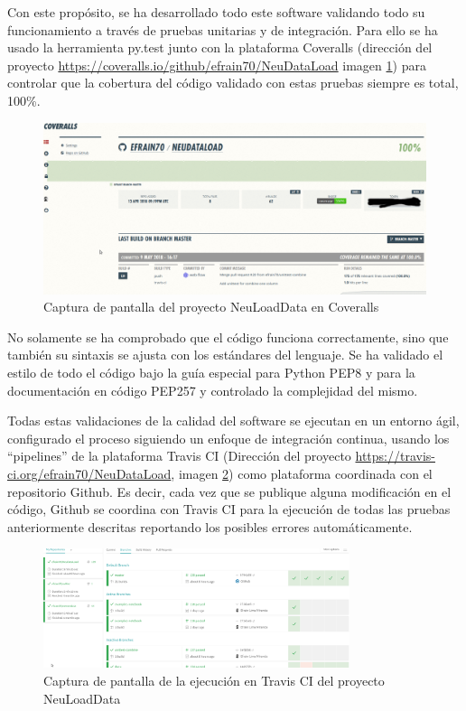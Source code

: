 Con este propósito, se ha desarrollado todo este software validando todo su funcionamiento a través de pruebas unitarias y de integración. Para ello se ha usado la herramienta py.test \cite{Pytest:Documentation} junto con la plataforma Coveralls \cite{CoverallsStatistics} (dirección del proyecto \url{https://coveralls.io/github/efrain70/NeuDataLoad} imagen \ref{figure:coveralls}) para controlar que la cobertura del código validado con estas pruebas siempre es total, 100\%.

\begin{figure}[H]
\centering
\includegraphics[width=1\textwidth]{figs/software/HFRiU5.png}
\caption{Captura de pantalla del proyecto NeuLoadData en Coveralls}
\label{figure:coveralls}
\end{figure}

No solamente se ha comprobado que el código funciona correctamente, sino que también su sintaxis se ajusta con los estándares del lenguaje. Se ha validado el estilo de todo el código bajo la guía especial para Python PEP8 \cite{PEPPython.orgb} y para la documentación en código PEP257 \cite{PEPPython.org} y controlado la complejidad del mismo.

Todas estas validaciones de la calidad del software se ejecutan en un entorno ágil, configurado el proceso siguiendo un enfoque de integración continua, usando los ``pipelines'' de la plataforma Travis CI \cite{TravisConfidence} (Dirección del proyecto \url{https://travis-ci.org/efrain70/NeuDataLoad}, imagen \ref{figure:travis}) como plataforma coordinada con el repositorio Github. Es decir, cada vez que se publique alguna modificación en el código, Github se coordina con Travis CI para la ejecución de todas las pruebas anteriormente descritas reportando los posibles errores automáticamente.

\begin{figure}[H]
\centering
\includegraphics[width=0.8\textwidth]{figs/software/travis.png}
\caption{Captura de pantalla de la ejecución en Travis CI del proyecto NeuLoadData}
\label{figure:travis}
\end{figure}

